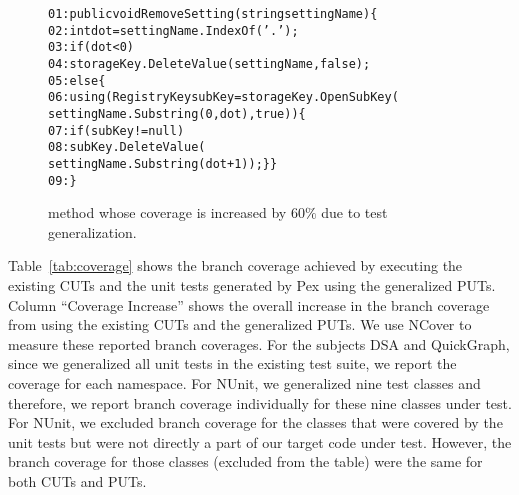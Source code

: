 \begin{figure}[t]
\begin{CodeOut}
\begin{alltt}
01: public void RemoveSetting(string settingName) \{
02: \hspace*{0.05in}int dot = settingName.IndexOf( '.' );
03: \hspace*{0.15in}if (dot < 0)
04: \hspace*{0.2in}storageKey.DeleteValue(settingName, false);
05: \hspace*{0.15in}else \{
06: \hspace*{0.2in}using(RegistryKey subKey = storageKey.OpenSubKey(
\hspace*{0.8in}settingName.Substring(0,dot),true))\{
07: \hspace*{0.3in}if (subKey != null)
08: \hspace*{0.5in}subKey.DeleteValue(
\hspace*{1.0in}settingName.Substring(dot + 1)); \} \}
09: \hspace*{0.02in}\} 
\end{alltt}
\end{CodeOut} \vspace*{-3ex}
\caption{ method whose coverage is increased by $60\%$ due to test generalization.} %
\label{fig:excoverage}
\end{figure}

Table~\ref{tab:coverage} shows the branch coverage achieved by executing the existing CUTs and the unit tests generated by Pex using the generalized PUTs. Column ``Coverage Increase'' shows the overall increase in the branch coverage from using the existing CUTs and the generalized PUTs. We use NCover to measure these reported branch coverages. For the subjects DSA and QuickGraph, since we generalized all unit tests in the existing test suite, we report the coverage for each namespace. For NUnit, we generalized nine test classes and therefore, we report branch coverage individually for these nine classes under test. For NUnit, we excluded branch coverage for the classes that were covered by the unit tests but were not directly a part of our target code under test. However, the branch coverage for those classes (excluded from the table) were the same for both CUTs and PUTs.


